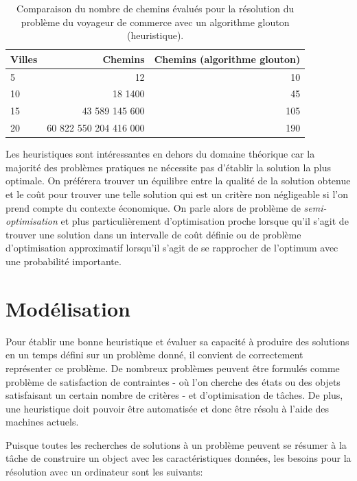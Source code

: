 \begin{table}[h]
\centering
\label{table-comparaison-chemins}
\begin{tabular}{ l|r|r }
  Villes & Chemins & Chemins (algorithme glouton) \\
  \hline
  5  & 12                     & 10  \\
  10 & 18 1400                & 45  \\
  15 & 43 589 145 600         & 105 \\
  20 & 60 822 550 204 416 000 & 190 \\
\end{tabular}
  \caption{Comparaison du nombre de chemins évalués pour la résolution du problème du voyageur de commerce avec un algorithme glouton (heuristique).}
\end{table}

Les heuristiques sont intéressantes en dehors du domaine théorique car la majorité des problèmes pratiques ne nécessite pas d'établir la solution la plus optimale. On préférera trouver un équilibre entre la qualité de la solution obtenue et le coût pour trouver une telle solution qui est un critère non négligeable si l'on prend compte du contexte économique. On parle alors de problème de \textit{semi-optimisation} et plus particulièrement d'optimisation proche lorsque qu'il s'agit de trouver une solution dans un intervalle de coût définie ou de problème d'optimisation approximatif lorsqu'il s'agit de se rapprocher de l'optimum avec une probabilité importante.


\section{Modélisation}
Pour établir une bonne heuristique et évaluer sa capacité à produire des solutions en un temps défini sur un problème donné, il convient de correctement représenter ce problème.
De nombreux problèmes peuvent être formulés comme problème de satisfaction de contraintes - où l'on cherche des états ou des objets satisfaisant un certain nombre de critères - et d'optimisation de tâches. De plus, une heuristique doit pouvoir être automatisée et donc être résolu à l'aide des machines actuels.

Puisque toutes les recherches de solutions à un problème peuvent se résumer à la tâche de construire un object avec les caractéristiques données, les besoins\cite{judea-pearl-heuristics} pour la résolution avec un ordinateur sont les suivants:

